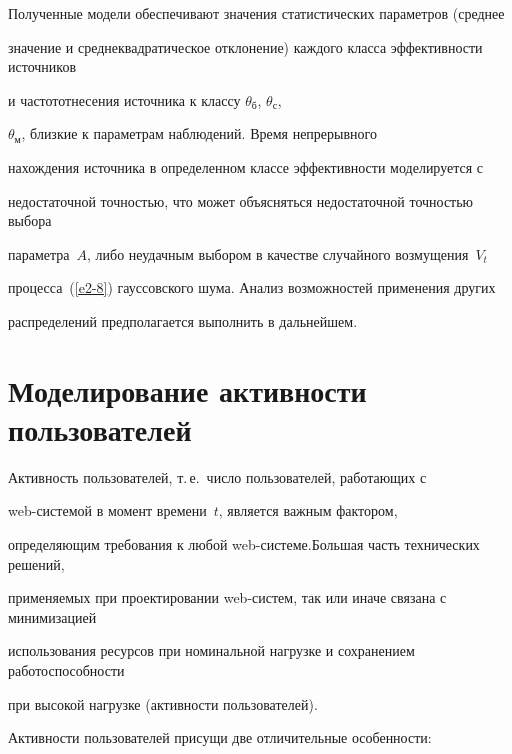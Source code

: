       Полученные модели обеспечивают значения статистических параметров (среднее 


значение и среднеквадратическое откло\-нение) каждого класса эффективности источников 


и частот\linebreak отнесения источника к классу $\theta_{\mathrm{б}}$, $\theta_{\mathrm{с}}$, 


$\theta_{\mathrm{м}}$, близкие к па\-ра\-мет\-рам наблюдений. Время непрерывного 


нахождения источника в определенном классе эффективности моделируется с 


недостаточной точ\-ностью, что может объясняться недостаточной точностью выбора 


параметра~$A$, либо неудачным выбором в качестве случайного возмущения~$V_t$ 


процесса~(\ref{e2-8}) гауссовского шума. Анализ возможностей применения других 


распределений предполагается выполнить в дальнейшем.





\section{Моделирование активности пользователей}





      Активность пользователей, т.\,е.\ число пользователей, работающих с 


      web-сис\-те\-мой в момент времени~$t$, является важным фактором, 


определяющим требования к любой web-системе.\linebreak Большая часть технических решений, 


применяемых при проектировании web-систем, так или иначе связана с минимизацией 


использования ресурсов при номинальной нагрузке и сохранением работоспособности 


при высокой нагрузке (\mbox{активности} пользователей).


      


      Активности пользователей присущи две отличительные особенности:


